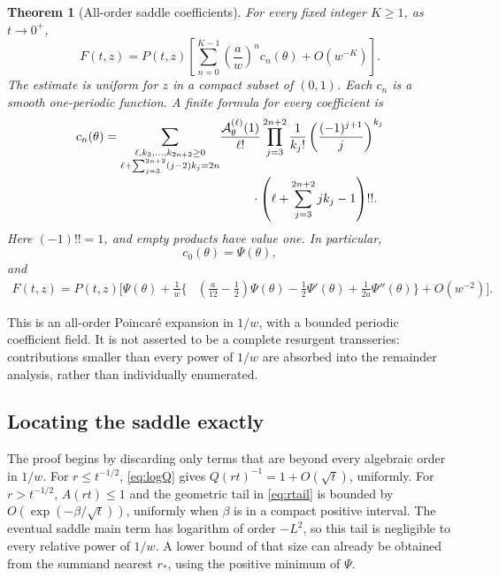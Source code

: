 \documentclass[11pt,oneside]{article}
\numberwithin{equation}{section}
\newtheorem{theorem}{Theorem}[section]
\theoremstyle{definition}
\theoremstyle{remark}
\begin{document}
\begin{theorem}[All-order saddle coefficients]
\label{thm:saddle}
For every fixed integer \(K\ge1\), as \(t\to0^+\),
\begin{equation}
 F(t,z)=P(t,z)\left[
       \sum_{n=0}^{K-1}\left(\frac aw\right)^n c_n(\theta)
       +O(w^{-K})\right].
 \label{eq:fullsaddle}
\end{equation}
The estimate is uniform for \(z\) in a compact subset of \((0,1)\). Each
\(c_n\) is a smooth one-periodic function. A finite formula for every
coefficient is
\begin{equation}
\begin{split}
 c_n(\theta)=
 \sum_{\substack{\ell,k_3,\ldots,k_{2n+2}\ge0\\
       \ell+\sum_{j=3}^{2n+2}(j-2)k_j=2n}}
 &\frac{\mathcal A_\theta^{(\ell)}(1)}{\ell!}
 \prod_{j=3}^{2n+2}
       \frac{1}{k_j!}\left(\frac{(-1)^{j+1}}j\right)^{k_j}\\[-1mm]
 &\hspace{9mm}\cdot
       \left(\ell+\sum_{j=3}^{2n+2}jk_j-1\right)!! .
\end{split}
\label{eq:cn}
\end{equation}
Here \((-1)!!=1\), and empty products have value one. In particular,
\begin{equation}
 c_0(\theta)=\Psi(\theta),
 \label{eq:c0}
\end{equation}
and
\begin{equation}
\begin{split}
 F(t,z)=P(t,z)\Bigg[\Psi(\theta)+\frac1w\bigg\{&
  \left(\frac a{12}-\frac12\right)\Psi(\theta)
  -\frac12\Psi'(\theta)
  +\frac1{2a}\Psi''(\theta)\bigg\}
  +O(w^{-2})\Bigg].
\end{split}
\label{eq:firstsaddle}
\end{equation}
\end{theorem}

This is an all-order Poincar\'e expansion in \(1/w\), with a bounded periodic
coefficient field. It is not asserted to be a complete resurgent transseries:
contributions smaller than every power of \(1/w\) are absorbed into the
remainder analysis, rather than individually enumerated.

\subsection{Locating the saddle exactly}
The proof begins by discarding only terms that are beyond every algebraic
order in \(1/w\). For \(r\le t^{-1/2}\), \eqref{eq:logQ} gives
\(Q(rt)^{-1}=1+O(\sqrt t)\), uniformly. For \(r>t^{-1/2}\),
\(A(rt)\le1\) and the geometric tail in \eqref{eq:rtail} is bounded by
\(O(\exp(-\beta/\sqrt t))\), uniformly when \(\beta\) is in a compact
positive interval. The eventual saddle main term has logarithm of order
\(-L^2\), so this tail is negligible to every relative power of \(1/w\).
A lower bound of that size can already be obtained from the summand nearest
\(r_*\), using the positive minimum of \(\Psi\).
\end{document}
